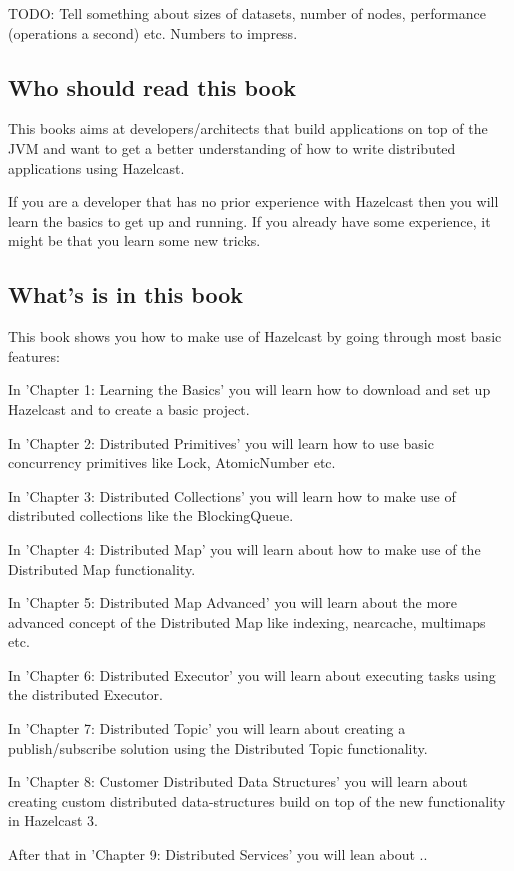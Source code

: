 TODO: Tell something about sizes of datasets, number of nodes, performance (operations a second) etc. Numbers to impress.

\subsection*{Who should read this book}
This books aims at developers/architects that build applications on top of the JVM and want to get a better understanding of how to write distributed applications using Hazelcast.

If you are a developer that has no prior experience with Hazelcast then you will learn the basics to get up and running. If you already have some experience, it might be that you learn some new tricks.

\subsection*{What's is in this book}

This book shows you how to make use of Hazelcast by going through most basic features:

In 'Chapter 1: Learning the Basics' you will learn how to download and set up Hazelcast and to create a basic project.

In 'Chapter 2: Distributed Primitives' you will learn how to use basic concurrency primitives like Lock, AtomicNumber etc.

In 'Chapter 3: Distributed Collections' you will learn how to make use of distributed collections like the BlockingQueue.

In 'Chapter 4: Distributed Map' you will learn about how to make use of the Distributed Map functionality.

In 'Chapter 5: Distributed Map Advanced' you will learn about the more advanced concept of the Distributed Map like indexing, nearcache, multimaps etc.

In 'Chapter 6: Distributed Executor' you will learn about executing tasks using the distributed Executor.

In 'Chapter 7: Distributed Topic' you will learn about creating a publish/subscribe solution using the Distributed Topic functionality.

In 'Chapter 8: Customer Distributed Data Structures' you will learn about creating custom distributed data-structures build on top of the new functionality in Hazelcast 3.

After that in  'Chapter 9: Distributed Services' you will lean about ..

